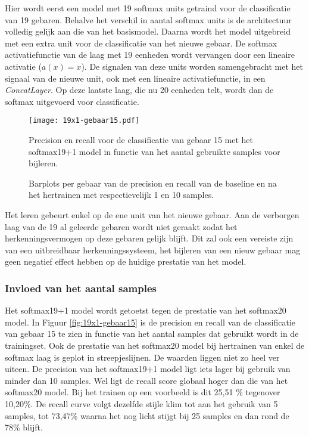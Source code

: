 
\npar Hier wordt eerst een model met 19 softmax units getraind voor de classificatie van 19 gebaren. Behalve het verschil in aantal softmax units is de architectuur volledig gelijk aan die van het basismodel. Daarna wordt het model uitgebreid met een extra unit voor de classificatie van het nieuwe gebaar. De softmax activatiefunctie van de laag met 19 eenheden wordt vervangen door een lineaire activatie ($a(x)=x$). De signalen van deze units worden samengebracht met het signaal van de nieuwe unit, ook met een lineaire activatiefunctie, in een \textit{ConcatLayer}.  Op deze laatste laag, die nu 20 eenheden telt, wordt dan de softmax uitgevoerd voor classificatie.

\begin{figure}
	\centering
	\texttt{[image: 19x1-gebaar15.pdf]}
	\caption{Precision en recall voor de classificatie van gebaar 15 met het softmax19+1 model in functie van het aantal gebruikte samples voor bijleren.}\label{fig:19x1-gebaar15}
	
		\vspace{0.5cm}
		\def\svgwidth{1.1\columnwidth}
		
		\caption{Barplots per gebaar van de precision en recall van de baseline en na het hertrainen met respectievelijk 1 en 10 samples. }\label{fig:19x1-all}
\end{figure}

\npar Het leren gebeurt enkel op de ene unit van het nieuwe gebaar. Aan de verborgen laag van de 19 al geleerde gebaren wordt niet geraakt zodat het herkenningsvermogen op deze gebaren gelijk blijft. Dit zal ook een vereiste zijn van een uitbreidbaar herkenningssysteem, het bijleren van een nieuw gebaar mag geen negatief effect hebben op de huidige prestatie van het model.

\subsubsection{Invloed van het aantal samples}

Het softmax19+1 model wordt getoetst tegen de prestatie van het softmax20 model. In Figuur \ref{fig:19x1-gebaar15} is de precision en recall van de classificatie van gebaar 15 te zien in functie van het aantal samples dat gebruikt wordt in de trainingset. Ook de prestatie van het softmax20 model bij hertrainen van enkel de softmax laag is geplot in streepjeslijnen. De waarden liggen niet zo heel ver uiteen. De precision van het softmax19+1 model ligt iets lager bij gebruik van minder dan 10 samples. Wel ligt de recall score globaal hoger dan die van het softmax20 model. Bij het trainen op een voorbeeld is dit 25,51 \% tegenover 10,20\%. De recall curve volgt dezelfde stijle klim tot aan het gebruik van 5 samples, tot 73,47\% waarna het nog licht stijgt bij 25 samples en dan rond de 78\% blijft.

